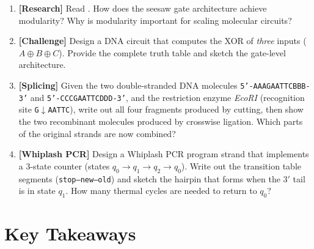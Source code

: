\begin{enumerate}[label=\textbf{2.\arabic*.}, leftmargin=2.5em]
\item \textbf{[Research]} Read \citet{qian2011seesaw}. How does the seesaw gate architecture achieve modularity? Why is modularity important for scaling molecular circuits?

\item \textbf{[Challenge]} Design a DNA circuit that computes the XOR of \emph{three} inputs ($A \oplus B \oplus C$). Provide the complete truth table and sketch the gate-level architecture.

\item \textbf{[Splicing]} Given the two double-stranded DNA molecules \texttt{5'-AAAGAATTCBBB-3'} and \texttt{5'-CCCGAATTCDDD-3'}, and the restriction enzyme \emph{EcoRI} (recognition site \texttt{G$\downarrow$AATTC}), write out all four fragments produced by cutting, then show the two recombinant molecules produced by crosswise ligation.  Which parts of the original strands are now combined?

\item \textbf{[Whiplash PCR]} Design a Whiplash PCR program strand that implements a 3-state counter (states $q_0 \to q_1 \to q_2 \to q_0$).  Write out the transition table segments (\texttt{stop--new--old}) and sketch the hairpin that forms when the 3$'$ tail is in state $q_1$.  How many thermal cycles are needed to return to $q_0$?

\end{enumerate}

\section{Key Takeaways}

